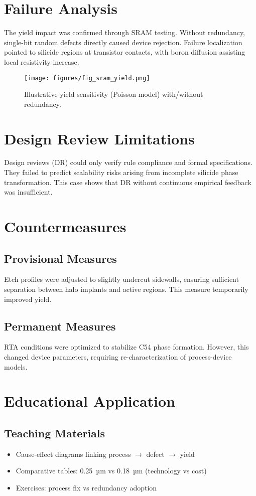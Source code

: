 \documentclass[conference]{IEEEtran}
\begin{document}
\section{Failure Analysis}
The yield impact was confirmed through SRAM testing. 
Without redundancy, single-bit random defects directly caused device rejection. 
Failure localization pointed to silicide regions at transistor contacts, with boron diffusion assisting local resistivity increase.

\begin{figure}[!t]
  \centering
  \texttt{[image: figures/fig\_sram\_yield.png]}
  \caption{Illustrative yield sensitivity (Poisson model) with/without redundancy.}
  \label{fig:yield}
\end{figure}

\section{Design Review Limitations}
Design reviews (DR) could only verify rule compliance and formal specifications. 
They failed to predict scalability risks arising from incomplete silicide phase transformation. 
This case shows that DR without continuous empirical feedback was insufficient.

\section{Countermeasures}
\subsection{Provisional Measures}
Etch profiles were adjusted to slightly undercut sidewalls, ensuring sufficient separation between halo implants and active regions. 
This measure temporarily improved yield.

\subsection{Permanent Measures}
RTA conditions were optimized to stabilize C54 phase formation. 
However, this changed device parameters, requiring re-characterization of process-device models.

\section{Educational Application}
\subsection{Teaching Materials}
\begin{itemize}
    \item Cause-effect diagrams linking process $\rightarrow$ defect $\rightarrow$ yield
    \item Comparative tables: 0.25~µm vs 0.18~µm (technology vs cost)
    \item Exercises: process fix vs redundancy adoption
\end{itemize}
\end{document}

